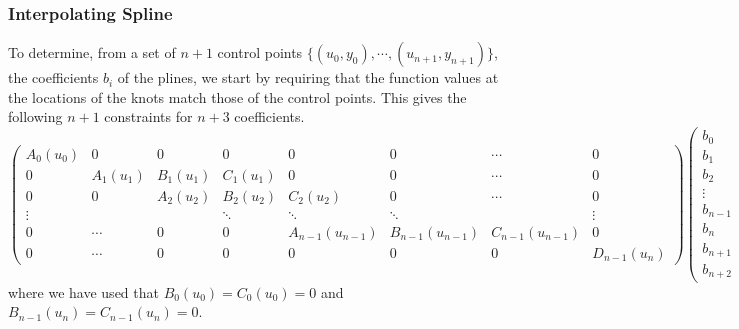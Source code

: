 \documentclass[a4paper,10pt,twosided]{article}
\begin{document}
\subsubsection{Interpolating Spline}
To determine, from a set of $n+1$ control points $\{(u_0,y_0),\cdots,(u_{n+1},y_{n+1})\}$, 
the coefficients $b_i$ of the plines, we start by requiring that the function
values at the locations of the knots match those of the control points. This gives 
the following $n+1$ constraints for $n+3$ coefficients.
\begin{equation}
   \left( \begin{array}{ccccccccccccc}  
      A_0(u_0)  & 0        & 0        & 0        & 0        & 0& \cdots & 0 
  \\  0         & A_1(u_1) & B_1(u_1) & C_1(u_1) & 0        & 0& \cdots & 0 
  \\  0         & 0        & A_2(u_2) & B_2(u_2) & C_2(u_2) & 0& \cdots & 0 
  \\ \vdots     &          &          & \ddots   & \ddots   & \ddots &   & \vdots
  \\  0 &  \cdots & 0 & 0 & A_{n-1}(u_{n-1}) & B_{n-1}(u_{n-1}) & C_{n-1}(u_{n-1})& 0 
  \\  0  & \cdots  & 0& 0  & 0 &  0           &  0            & D_{n-1}(u_n)
    \end{array} \right) 
   \left( \begin{array}{c} b_0 \\ b_1 \\ b_2 \\ \vdots \\ b_{n-1} \\ b_n \\ b_{n+1} \\ b_{n+2} \end{array}  \right) 
   = \left( \begin{array}{c}  y_0 \\ y_1 \\ y_2 \\ \vdots \\ y_{n-1} \\ y_n \end{array}\right)
\end{equation}
where we have used that $B_0(u_0)=C_0(u_0)=0$ and $B_{n-1}(u_n)=C_{n-1}(u_n)=0$.
\end{document}
